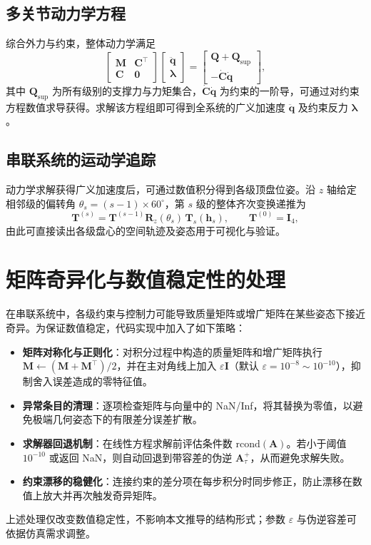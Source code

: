 \documentclass[12pt,a4paper]{article}
\begin{document}
\subsection{多关节动力学方程}
综合外力与约束，整体动力学满足
\begin{equation}
  \begin{bmatrix}
    \bm M & \bm C^\top \\
    \bm C & \bm 0
  \end{bmatrix}
  \begin{bmatrix}
    \ddot{\bm q}\\ \bm \lambda
  \end{bmatrix}
  =
  \begin{bmatrix}
    \bm Q + \bm Q_{\text{sup}}\\ -\dot{\bm C}\dot{\bm q}
  \end{bmatrix},
\end{equation}
其中 $\bm Q_{\text{sup}}$ 为所有级别的支撑力与力矩集合，$\dot{\bm C}\dot{\bm q}$ 为约束的一阶导，可通过对约束方程数值求导获得。求解该方程组即可得到全系统的广义加速度 $\ddot{\bm q}$ 及约束反力 $\bm \lambda$。

\subsection{串联系统的运动学追踪}\label{sec:multi_kinematics}

动力学求解获得广义加速度后，可通过数值积分得到各级顶盘位姿。沿 $z$ 轴给定相邻级的偏转角 $\theta_s = (s-1)\times 60^\circ$，第 $s$ 级的整体齐次变换递推为
\begin{equation}
  \bm T^{(s)} = \bm T^{(s-1)} \bm R_z(\theta_s)\, \bm T_s(\bm h_s), \qquad \bm T^{(0)} = \bm I_4,
\end{equation}
由此可直接读出各级盘心的空间轨迹及姿态用于可视化与验证。

\section{矩阵奇异化与数值稳定性的处理}
在串联系统中，各级约束与控制力可能导致质量矩阵或增广矩阵在某些姿态下接近奇异。为保证数值稳定，代码实现中加入了如下策略：
\begin{itemize}
  \item \textbf{矩阵对称化与正则化}：对积分过程中构造的质量矩阵和增广矩阵执行 $\bm M \leftarrow (\bm M + \bm M^\top)/2$，并在主对角线上加入 $\varepsilon\bm I$（默认 $\varepsilon=10^{-8}\sim 10^{-10}$），抑制舍入误差造成的零特征值。
  \item \textbf{异常条目的清理}：逐项检查矩阵与向量中的 NaN/Inf，将其替换为零值，以避免极端几何姿态下的有限差分误差扩散。
  \item \textbf{求解器回退机制}：在线性方程求解前评估条件数 $\mathrm{rcond}(\bm A)$。若小于阈值 $10^{-10}$ 或返回 NaN，则自动回退到带容差的伪逆 $\bm A^+_{\tau}$，从而避免求解失败。
  \item \textbf{约束漂移的稳健化}：连接约束的差分项在每步积分时同步修正，防止漂移在数值上放大并再次触发奇异矩阵。
\end{itemize}
上述处理仅改变数值稳定性，不影响本文推导的结构形式；参数 $\varepsilon$ 与伪逆容差可依据仿真需求调整。
\end{document}
